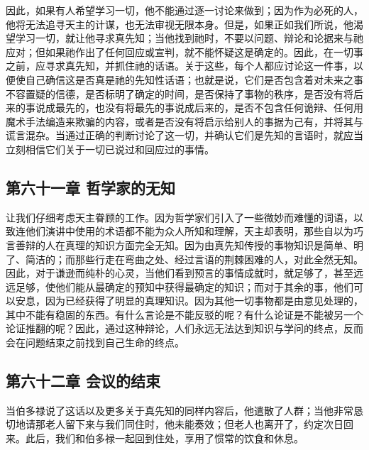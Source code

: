因此，如果有人希望学习一切，他不能通过逐一讨论来做到；因为作为必死的人，他将无法追寻天主的计谋，也无法审视无限本身。但是，如果正如我们所说，他渴望学习一切，就让他寻求真先知；当他找到祂时，不要以问题、辩论和论据来与祂应对；但如果祂作出了任何回应或宣判，就不能怀疑这是确定的。因此，在一切事之前，应寻求真先知，并抓住祂的话语。关于这些，每个人都应讨论这一件事，以便使自己确信这是否真是祂的先知性话语；也就是说，它们是否包含着对未来之事不容置疑的信德，是否标明了确定的时间，是否保持了事物的秩序，是否没有将后来的事说成最先的，也没有将最先的事说成后来的，是否不包含任何诡辩、任何用魔术手法编造来欺骗的内容，或者是否没有将启示给别人的事据为己有，并将其与谎言混杂。当通过正确的判断讨论了这一切，并确认它们是先知的言语时，就应当立刻相信它们关于一切已说过和回应过的事情。\par


\subsection{第六十一章 哲学家的无知}

让我们仔细考虑天主眷顾的工作。因为哲学家们引入了一些微妙而难懂的词语，以致连他们演讲中使用的术语都不能为众人所知和理解，天主却表明，那些自以为巧言善辩的人在真理的知识方面完全无知。因为由真先知传授的事物知识是简单、明了、简洁的；而那些行走在弯曲之处、经过言语的荆棘困难的人，对此全然无知。因此，对于谦逊而纯朴的心灵，当他们看到预言的事情成就时，就足够了，甚至远远足够，使他们能从最确定的预知中获得最确定的知识；而对于其余的事，他们可以安息，因为已经获得了明显的真理知识。因为其他一切事物都是由意见处理的，其中不能有稳固的东西。有什么言论是不能反驳的呢？有什么论证是不能被另一个论证推翻的呢？因此，通过这种辩论，人们永远无法达到知识与学问的终点，反而会在问题结束之前找到自己生命的终点。\par


\subsection{第六十二章 会议的结束}

当伯多禄说了这话以及更多关于真先知的同样内容后，他遣散了人群；当他非常恳切地请那老人留下来与我们同住时，他未能奏效；但老人也离开了，约定次日回来。此后，我们和伯多禄一起回到住处，享用了惯常的饮食和休息。\par

